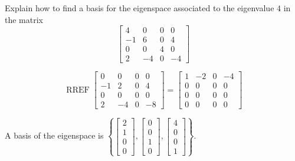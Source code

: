 
\begin{exerciseStatement}


Explain how to find a basis for the eigenspace associated to the eigenvalue \( 4 \) in the matrix \[ \left[\begin{array}{cccc}
4 & 0 & 0 & 0 \\
-1 & 6 & 0 & 4 \\
0 & 0 & 4 & 0 \\
2 & -4 & 0 & -4
\end{array}\right] \]


\end{exerciseStatement}
    
\begin{exerciseAnswer} 


\[\operatorname{RREF} \left[\begin{array}{cccc}
0 & 0 & 0 & 0 \\
-1 & 2 & 0 & 4 \\
0 & 0 & 0 & 0 \\
2 & -4 & 0 & -8
\end{array}\right] = \left[\begin{array}{cccc}
1 & -2 & 0 & -4 \\
0 & 0 & 0 & 0 \\
0 & 0 & 0 & 0 \\
0 & 0 & 0 & 0
\end{array}\right] \]



A basis of the eigenspace is \( \left\{ \left[\begin{array}{c}
2 \\
1 \\
0 \\
0
\end{array}\right] , \left[\begin{array}{c}
0 \\
0 \\
1 \\
0
\end{array}\right] , \left[\begin{array}{c}
4 \\
0 \\
0 \\
1
\end{array}\right] \right\} \).


\end{exerciseAnswer}
    
